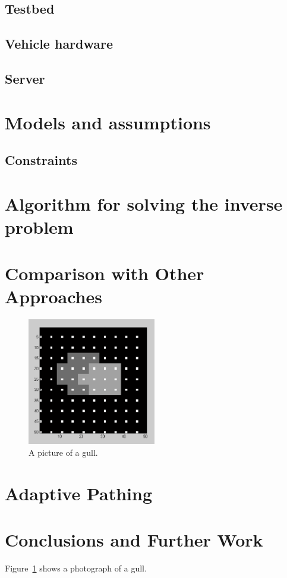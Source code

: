 \documentclass[english]{article}\usepackage[]{graphicx}\usepackage[]{color}
\begin{document}
\subsection{Testbed}
\subsection{Vehicle hardware}
\subsection{Server}

\section{Models and assumptions}
\subsection{Constraints}

\section{Algorithm for solving the inverse problem}

\section{Comparison with Other Approaches}

\begin{figure}[h!]
  \centering
    \includegraphics[width=0.5\textwidth]{figures/gridpointexpansion}
  \caption{A picture of a gull.}
  \label{fig:gridpointexpansion}
\end{figure}


\section{Adaptive Pathing}

\section{Conclusions and Further Work}
Figure~\ref{fig:gridpointexpansion} shows a photograph of a gull.
\end{document}
